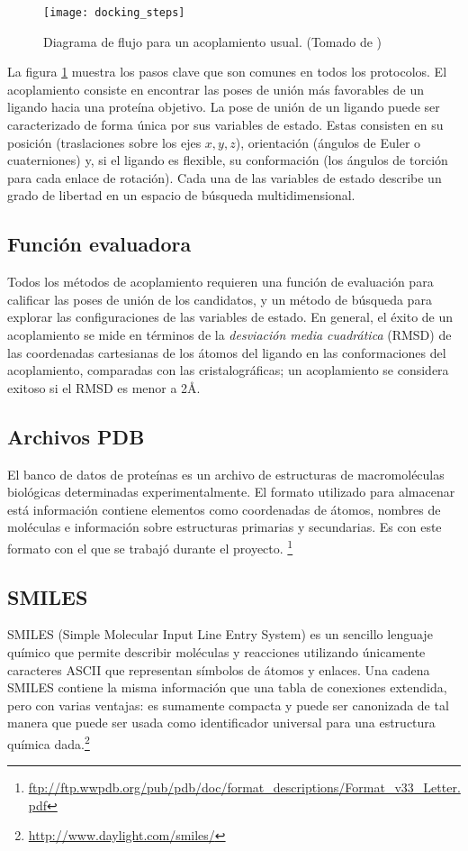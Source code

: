 \begin{figure}[H]
  \texttt{[image: docking\_steps]}
  \caption{Diagrama de flujo para un acoplamiento usual.  (Tomado de
    \cite{kukol})}
  \label{fig:docking_flowchart}
\end{figure}

La figura \ref{fig:docking_flowchart} muestra los pasos clave que son comunes en
todos los protocolos. El acoplamiento consiste en encontrar las poses de unión
más favorables de un ligando hacia una proteína objetivo. La
pose de unión de un ligando puede ser caracterizado de forma única por sus
variables de estado. Estas consisten en su posición (traslaciones sobre los ejes
$x, y, z$), orientación (ángulos de Euler o cuaterniones) y, si el ligando es
flexible, su conformación (los ángulos de torción para cada enlace de
rotación). Cada una de las variables de estado describe un grado de libertad en
un espacio de búsqueda multidimensional.

\subsection{Función evaluadora}
Todos los métodos de acoplamiento requieren una función de evaluación
para calificar las poses de unión de los candidatos, y un método
de búsqueda para explorar las configuraciones de las variables de
estado. En general, el éxito de un acoplamiento se mide en términos de
la \textit{desviación media cuadrática} (RMSD) de las coordenadas
cartesianas de los átomos del ligando en las conformaciones del
acoplamiento, comparadas con las cristalográficas; un acoplamiento se
considera exitoso si el RMSD es menor a 2\AA.

\subsection{Archivos PDB}
El banco de datos de proteínas es un archivo de estructuras de macromoléculas
biológicas determinadas experimentalmente. El formato utilizado para almacenar
está información contiene elementos como coordenadas de átomos, nombres de
moléculas e información sobre estructuras primarias y secundarias. Es con este
formato con el que se trabajó durante el proyecto.
\footnote{\url{ftp://ftp.wwpdb.org/pub/pdb/doc/format_descriptions/Format_v33_Letter.pdf}}

\subsection{SMILES}
SMILES (Simple Molecular Input Line Entry System) es un sencillo lenguaje
químico que permite describir moléculas y reacciones utilizando únicamente
caracteres ASCII que representan símbolos de átomos y enlaces. Una cadena SMILES
contiene la misma información que una tabla de conexiones extendida, pero con
varias ventajas: es sumamente compacta y puede ser canonizada de tal manera
que puede ser usada como identificador universal para una estructura química
dada.\footnote{\url{http://www.daylight.com/smiles/}}
